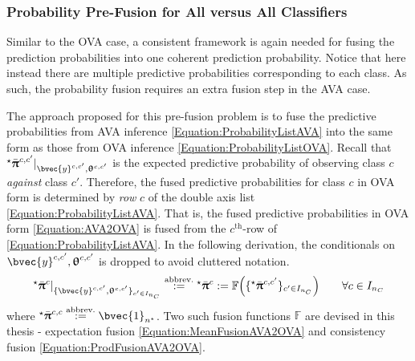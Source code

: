 			\subsubsection{Probability Pre-Fusion for All versus All Classifiers}
			\label{BenthicHabitatMapping:Classification:MulticlassClassification:ProbabilityPreFusion}
						
				Similar to the OVA case, a consistent framework is again needed for fusing the prediction probabilities into one coherent prediction probability. Notice that here instead there are multiple predictive probabilities corresponding to each class. As such, the probability fusion requires an extra fusion step in the AVA case. 
			
				The approach proposed for this pre-fusion problem is to fuse the predictive probabilities from AVA inference \eqref{Equation:ProbabilityListAVA} into the same form as those from OVA inference \eqref{Equation:ProbabilityListOVA}. Recall that ${^{\star}}\bar{\vec{\uppi}}^{c, c'} |_{\bvec{y}^{c, c'}, \vec{\uptheta}^{c, c'}}$ is the expected predictive probability of observing class $c$ \textit{against} class $c'$. Therefore, the fused predictive probabilities for class $c$ in OVA form is determined by \textit{row} $c$ of the double axis list \eqref{Equation:ProbabilityListAVA}. That is, the fused predictive probabilities in OVA form \eqref{Equation:AVA2OVA} is fused from the $c^{\mathrm{th}}$-row of \eqref{Equation:ProbabilityListAVA}. In the following derivation, the conditionals on $\bvec{y}^{c, c'}, \vec{\uptheta}^{c, c'}$ is dropped to avoid cluttered notation. \begin{equation}
					\begin{aligned}
						{^{\star}}\bar{\vec{\uppi}}^{c} |_{\{ \bvec{y}^{c, c'}, \vec{\uptheta}^{c, c'} \}_{c' \in I_{n_{C}}}} \stackrel{\text{abbrev.}}{:=} {^{\star}}\bar{\vec{\uppi}}^{c} := \mathbb{F}\Big(\{{^{\star}}\bar{\vec{\uppi}}^{c, c'}\}_{c' \in I_{n_{C}}}\Big) \qquad \forall c \in I_{n_{C}}
					\end{aligned}
				\label{Equation:AVA2OVA}
				\end{equation} where ${^{\star}}\bar{\vec{\uppi}}^{c, c} \stackrel{\text{abbrev.}}{:=} \bvec{1}_{n^{\star}}$. Two such fusion functions $\mathbb{F}$ are devised in this thesis - expectation fusion \eqref{Equation:MeanFusionAVA2OVA} and consistency fusion \eqref{Equation:ProdFusionAVA2OVA}.
				
